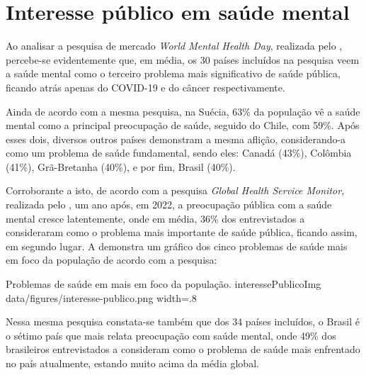 \section{Interesse público em saúde mental}
\label{sec:interessePublico}

Ao analisar a pesquisa de mercado \textit{World Mental Health Day}, realizada pelo , percebe-se evidentemente que, em média, os 30 países incluídos na pesquisa veem a saúde mental como o terceiro problema mais significativo de saúde pública, ficando atrás apenas do COVID-19 e do câncer respectivamente.

Ainda de acordo com a mesma pesquisa, na Suécia, 63\% da população vê a saúde mental como a principal preocupação de saúde, seguido do Chile, com 59\%. Após esses dois, diversos outros países demonstram a mesma aflição, considerando-a como um problema de saúde fundamental, sendo eles: Canadá (43\%), Colômbia (41\%), Grã-Bretanha (40\%), e por fim, Brasil (40\%).

Corroborante a isto, de acordo com a pesquisa \textit{Global Health Service Monitor}, realizada pelo , um ano após, em 2022, a preocupação pública com a saúde mental cresce latentemente, onde em média, 36\% dos entrevistados a consideraram como o problema mais importante de saúde pública, ficando assim, em segundo lugar. A  demonstra um gráfico dos cinco problemas de saúde mais em foco da população de acordo com a pesquisa:

\image
    {Problemas de saúde em mais em foco da população.}
    {interessePublicoImg}
    {data/figures/interesse-publico.png}
    {width=.8\textwidth}
    {}

Nessa mesma pesquisa constata-se também que dos 34 países incluídos, o Brasil é o sétimo país que mais relata preocupação com saúde mental, onde 49\% dos brasileiros entrevistados a consideram como o problema de saúde mais enfrentado no país atualmente, estando muito acima da média global.
